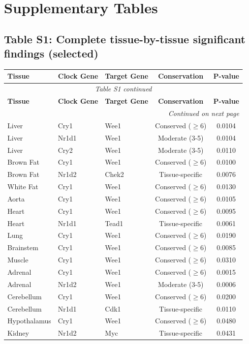 \documentclass[11pt,letterpaper]{article}
\begin{document}
\newpage
\section*{Supplementary Tables}

\subsection*{Table S1: Complete tissue-by-tissue significant findings (selected)}

\begin{longtable}{lllcc}
\toprule
\textbf{Tissue} & \textbf{Clock Gene} & \textbf{Target Gene} & \textbf{Conservation} & \textbf{P-value} \\
\midrule
\endfirsthead
\multicolumn{5}{c}{\textit{Table S1 continued}} \\
\toprule
\textbf{Tissue} & \textbf{Clock Gene} & \textbf{Target Gene} & \textbf{Conservation} & \textbf{P-value} \\
\midrule
\endhead
\midrule
\multicolumn{5}{r}{\textit{Continued on next page}} \\
\endfoot
\bottomrule
\endlastfoot
Liver & Cry1 & Wee1 & Conserved ($\geq$6) & 0.0104 \\
Liver & Nr1d1 & Wee1 & Moderate (3-5) & 0.0104 \\
Liver & Cry2 & Wee1 & Moderate (3-5) & 0.0110 \\
Brown Fat & Cry1 & Wee1 & Conserved ($\geq$6) & 0.0100 \\
Brown Fat & Nr1d2 & Chek2 & Tissue-specific & 0.0076 \\
White Fat & Cry1 & Wee1 & Conserved ($\geq$6) & 0.0130 \\
Aorta & Cry1 & Wee1 & Conserved ($\geq$6) & 0.0105 \\
Heart & Cry1 & Wee1 & Conserved ($\geq$6) & 0.0095 \\
Heart & Nr1d1 & Tead1 & Tissue-specific & 0.0061 \\
Lung & Cry1 & Wee1 & Conserved ($\geq$6) & 0.0190 \\
Brainstem & Cry1 & Wee1 & Conserved ($\geq$6) & 0.0085 \\
Muscle & Cry1 & Wee1 & Conserved ($\geq$6) & 0.0310 \\
Adrenal & Cry1 & Wee1 & Conserved ($\geq$6) & 0.0015 \\
Adrenal & Nr1d2 & Wee1 & Moderate (3-5) & 0.0006 \\
Cerebellum & Cry1 & Wee1 & Conserved ($\geq$6) & 0.0200 \\
Cerebellum & Nr1d1 & Cdk1 & Tissue-specific & 0.0110 \\
Hypothalamus & Cry1 & Wee1 & Conserved ($\geq$6) & 0.0480 \\
Kidney & Nr1d2 & Myc & Tissue-specific & 0.0431 \\
\end{longtable}
\end{document}
